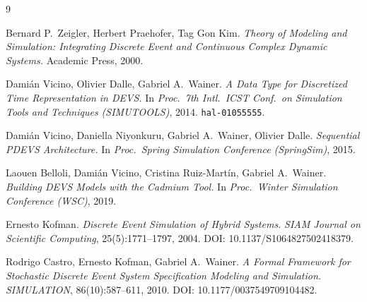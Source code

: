 \documentclass[11pt,a4paper]{article}
\begin{document}
\begin{thebibliography}{9}

  Bernard P.\ Zeigler, Herbert Praehofer, Tag Gon Kim.
  \textit{Theory of Modeling and Simulation: Integrating Discrete Event
  and Continuous Complex Dynamic Systems.}
  Academic Press, 2000.

  Damián Vicino, Olivier Dalle, Gabriel A.\ Wainer.
  \textit{A Data Type for Discretized Time Representation in DEVS.}
  In \textit{Proc.\ 7th Intl.\ ICST Conf.\ on Simulation Tools and
  Techniques (SIMUTOOLS)}, 2014.
  \texttt{hal-01055555}.

  Damián Vicino, Daniella Niyonkuru, Gabriel A.\ Wainer, Olivier Dalle.
  \textit{Sequential PDEVS Architecture.}
  In \textit{Proc.\ Spring Simulation Conference (SpringSim)}, 2015.

  Laouen Belloli, Damián Vicino, Cristina Ruiz-Martín, Gabriel A.\ Wainer.
  \textit{Building DEVS Models with the Cadmium Tool.}
  In \textit{Proc.\ Winter Simulation Conference (WSC)}, 2019.

  Ernesto Kofman.
  \textit{Discrete Event Simulation of Hybrid Systems.}
  \textit{SIAM Journal on Scientific Computing}, 25(5):1771--1797, 2004.
  DOI: 10.1137/S1064827502418379.

  Rodrigo Castro, Ernesto Kofman, Gabriel A.\ Wainer.
  \textit{A Formal Framework for Stochastic Discrete Event System Specification
  Modeling and Simulation.}
  \textit{SIMULATION}, 86(10):587--611, 2010.
  DOI: 10.1177/0037549709104482.

\end{thebibliography}
\end{document}

